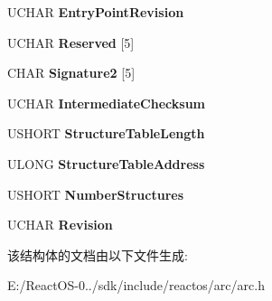 \begin{DoxyCompactItemize}
U\+C\+H\+AR {\bfseries Entry\+Point\+Revision}
\item 
\mbox{\label{struct___s_m_b_i_o_s___t_a_b_l_e___h_e_a_d_e_r_a9ef275d83515956b304f40534e43fd08}} 
U\+C\+H\+AR {\bfseries Reserved} \mbox{[}5\mbox{]}
\item 
\mbox{\label{struct___s_m_b_i_o_s___t_a_b_l_e___h_e_a_d_e_r_a8fd6e0caf8bbc470a9b6ce3858a281be}} 
C\+H\+AR {\bfseries Signature2} \mbox{[}5\mbox{]}
\item 
\mbox{\label{struct___s_m_b_i_o_s___t_a_b_l_e___h_e_a_d_e_r_a49575dd852ebc4aea8f12174c198be5e}} 
U\+C\+H\+AR {\bfseries Intermediate\+Checksum}
\item 
\mbox{\label{struct___s_m_b_i_o_s___t_a_b_l_e___h_e_a_d_e_r_a85ed2a8056c487cbe3445d7eeacfdaea}} 
U\+S\+H\+O\+RT {\bfseries Structure\+Table\+Length}
\item 
\mbox{\label{struct___s_m_b_i_o_s___t_a_b_l_e___h_e_a_d_e_r_a0b0ad8895d7772c6515ce66fd9dfab93}} 
U\+L\+O\+NG {\bfseries Structure\+Table\+Address}
\item 
\mbox{\label{struct___s_m_b_i_o_s___t_a_b_l_e___h_e_a_d_e_r_a29a7bcdc95012359a9fba5e302d04ea0}} 
U\+S\+H\+O\+RT {\bfseries Number\+Structures}
\item 
\mbox{\label{struct___s_m_b_i_o_s___t_a_b_l_e___h_e_a_d_e_r_a7a279f3c442592878e392d299fc77354}} 
U\+C\+H\+AR {\bfseries Revision}
\end{DoxyCompactItemize}


该结构体的文档由以下文件生成\+:\begin{DoxyCompactItemize}
\item 
E\+:/\+React\+O\+S-\/0../sdk/include/reactos/arc/arc.\+h\end{DoxyCompactItemize}
